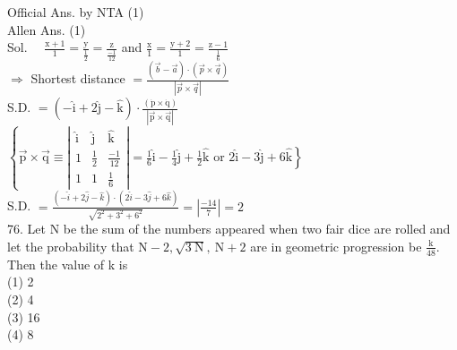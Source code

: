 \documentclass[10pt]{article}
\begin{document}
Official Ans. by NTA (1)\\
Allen Ans. (1)\\
Sol. \(\quad \frac{\mathrm{x}+1}{1}=\frac{\mathrm{y}}{\frac{1}{2}}=\frac{\mathrm{z}}{\frac{-1}{12}}\) and \(\frac{\mathrm{x}}{1}=\frac{\mathrm{y}+2}{1}=\frac{\mathrm{z}-1}{\frac{1}{6}}\)\\
\(\Rightarrow\) Shortest distance \(=\frac{(\vec{b}-\vec{a}) \cdot(\vec{p} \times \vec{q})}{|\vec{p} \times \vec{q}|}\)\\
S.D. \(=(-\hat{\mathrm{i}}+2 \hat{\mathrm{j}}-\hat{\mathrm{k}}) \cdot \frac{(\dot{\mathrm{p}} \times \dot{\mathrm{q}})}{|\overrightarrow{\mathrm{p}} \times \overrightarrow{\mathrm{q}}|}\)\\
\(\left\{\overrightarrow{\mathrm{p}} \times \overrightarrow{\mathrm{q}} \equiv\left|\begin{array}{ccc}\hat{\mathrm{i}} & \hat{\mathrm{j}} & \hat{\mathrm{k}} \\ 1 & \frac{1}{2} & \frac{-1}{12} \\ 1 & 1 & \frac{1}{6}\end{array}\right|=\frac{1}{6} \hat{\mathrm{i}}-\frac{1}{4} \hat{\mathrm{j}}+\frac{1}{2} \hat{\mathrm{k}}\right.\) or \(\left.2 \hat{\mathrm{i}}-3 \hat{\mathrm{j}}+6 \hat{\mathrm{k}}\right\}\)\\
S.D. \(=\frac{(-\hat{i}+2 \hat{j}-\hat{k}) \cdot(2 \hat{i}-3 \hat{j}+6 \hat{k})}{\sqrt{2^{2}+3^{2}+6^{2}}}=\left|\frac{-14}{7}\right|=2\)\\
76. Let N be the sum of the numbers appeared when two fair dice are rolled and let the probability that \(\mathrm{N}-2, \sqrt{3 \mathrm{~N}}, \mathrm{~N}+2\) are in geometric progression be \(\frac{\mathrm{k}}{48}\). Then the value of k is\\
(1) 2\\
(2) 4\\
(3) 16\\
(4) 8
\end{document}
